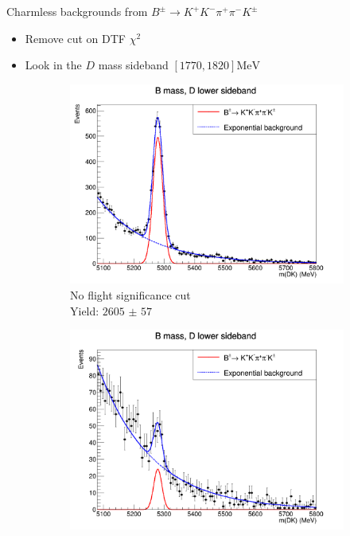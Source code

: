 \documentclass{beamer}
\begin{document}
\begin{frame}{Charmless backgrounds from \texorpdfstring{$B^\pm\to K^+K^-\pi^+\pi^-K^\pm$}{B to K K pi pi K}}
  \begin{itemize}
    \item{Remove cut on DTF $\chi^2$}
    \item{Look in the $D$ mass sideband $[1770, 1820]\si{\mega\eV}$}
  \end{itemize}
  \begin{figure}
    \centering
    \vspace{-0.2cm}
    \begin{subfigure}{0.5\textwidth}
      \includegraphics[width = 1.0\textwidth]{Plots/B2DKLower_Charmless.png}
      \caption{No flight significance cut \\ Yield: $\SI{2605(57)}{}$}
    \end{subfigure}%
    \begin{subfigure}{0.5\textwidth}
      \includegraphics[width = 1.0\textwidth]{Plots/B2DKLowerFDCut_Charmless.png}

\end{subfigure}
\end{figure}
\end{frame}
\end{document}

